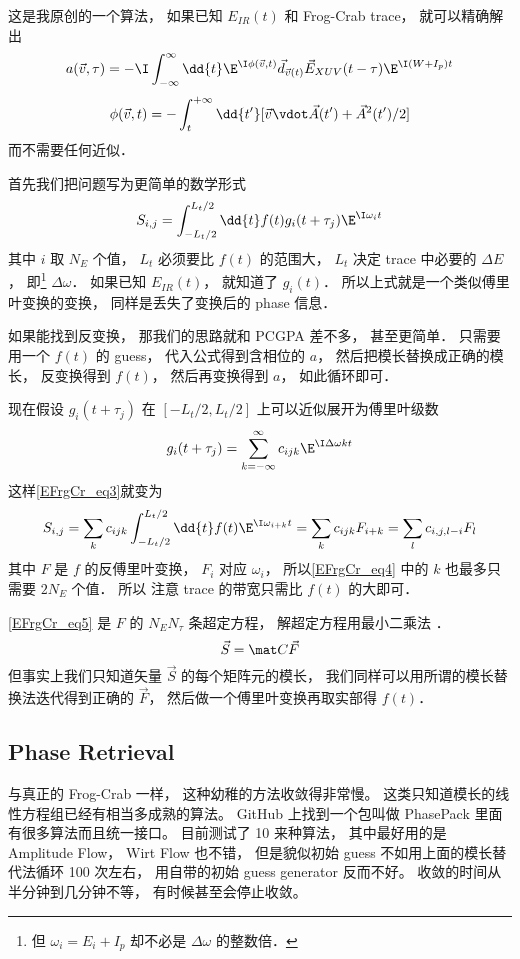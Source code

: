 这是我原创的一个算法， 如果已知 $E_{IR}(t)$ 和 Frog-Crab trace， 就可以精确解出
\begin{equation}
a(\vec v, \tau) = -\I\int_{-\infty}^{\infty} \dd{t} \E^{\I\phi(\vec v, t)} \vec d_{\vec v(t)} \vec E_{XUV}(t-\tau) \E^{\I(W+I_p)t}
\end{equation}
\begin{equation}
\phi(\vec v, t) = -\int_t^{+\infty} \dd{t'} [\vec v\vdot \vec A(t') + \vec A^2(t')/2]
\end{equation}
而不需要任何近似．

首先我们把问题写为更简单的数学形式
\begin{equation}\label{EFrgCr_eq3}
S_{i, j} = \int_{-L_t/2}^{L_t/2} \dd{t} f(t) g_i(t+\tau_j)\E^{\I\omega_i t}
\end{equation}
其中 $i$ 取 $N_E$ 个值， $L_t$ 必须要比 $f(t)$ 的范围大， $L_t$ 决定 trace 中必要的 $\Delta E$， 即\footnote{但 $\omega_i = E_i + I_p$ 却不必是 $\Delta \omega$ 的整数倍．} $\Delta \omega$． 如果已知 $E_{IR}(t)$， 就知道了 $g_i(t)$． 所以上式就是一个类似傅里叶变换的变换， 同样是丢失了变换后的 phase 信息．

如果能找到反变换， 那我们的思路就和 PCGPA 差不多， 甚至更简单． 只需要用一个 $f(t)$ 的 guess， 代入公式得到含相位的 $a$， 然后把模长替换成正确的模长， 反变换得到 $f(t)$， 然后再变换得到 $a$， 如此循环即可．

现在假设 $g_i(t + \tau_j)$ 在 $[-L_t/2, L_t/2]$ 上可以近似展开为傅里叶级数
\begin{equation}\label{EFrgCr_eq4}
g_i(t + \tau_j) = \sum_{k=-\infty}^{\infty} c_{ijk} \E^{\I \Delta \omega kt}
\end{equation}
这样\autoref{EFrgCr_eq3}就变为
\begin{equation}\label{EFrgCr_eq5}
S_{i, j} = \sum_k c_{ijk} \int_{-L_t/2}^{L_t/2} \dd{t} f(t) \E^{\I \omega_{i+k} t}
= \sum_k c_{ijk} F_{i+k} = \sum_l c_{i,j,l-i} F_l
\end{equation}
其中 $F$ 是 $f$ 的反傅里叶变换， $F_i$ 对应 $\omega_i$， 所以\autoref{EFrgCr_eq4} 中的 $k$ 也最多只需要 $2N_E$ 个值． 所以 注意 trace 的带宽只需比 $f(t)$ 的大即可．

\autoref{EFrgCr_eq5} 是 $F$ 的 $N_E N_\tau$ 条超定方程， 解超定方程用最小二乘法%
．
\begin{equation}
\vec S = \mat C \vec F
\end{equation}
但事实上我们只知道矢量 $\vec S$ 的每个矩阵元的模长， 我们同样可以用所谓的模长替换法迭代得到正确的 $\vec F$， 然后做一个傅里叶变换再取实部得 $f(t)$．

\subsection{Phase Retrieval}
与真正的 Frog-Crab 一样， 这种幼稚的方法收敛得非常慢。 这类只知道模长的线性方程组已经有相当多成熟的算法。 GitHub 上找到一个包叫做 PhasePack 里面有很多算法而且统一接口。 目前测试了 10 来种算法， 其中最好用的是 Amplitude Flow， Wirt Flow 也不错， 但是貌似初始 guess 不如用上面的模长替代法循环 100 次左右， 用自带的初始 guess generator 反而不好。 收敛的时间从半分钟到几分钟不等， 有时候甚至会停止收敛。
